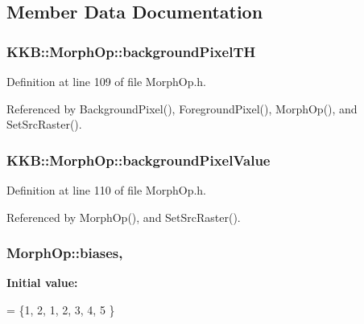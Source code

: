 \subsection{Member Data Documentation}
\subsubsection[{\texorpdfstring{background\+Pixel\+TH}{backgroundPixelTH}}]{ K\+K\+B\+::\+Morph\+Op\+::background\+Pixel\+TH\hspace{0.3cm}{\ttfamily [protected]}}\hypertarget{class_k_k_b_1_1_morph_op_a0f9e76c2f2c45f0563567c49cd69a43b}{}\label{class_k_k_b_1_1_morph_op_a0f9e76c2f2c45f0563567c49cd69a43b}


Definition at line 109 of file Morph\+Op.\+h.



Referenced by Background\+Pixel(), Foreground\+Pixel(), Morph\+Op(), and Set\+Src\+Raster().

\subsubsection[{\texorpdfstring{background\+Pixel\+Value}{backgroundPixelValue}}]{ K\+K\+B\+::\+Morph\+Op\+::background\+Pixel\+Value\hspace{0.3cm}{\ttfamily [protected]}}\hypertarget{class_k_k_b_1_1_morph_op_a0c3862d1c8427c4d246e0bcd56699741}{}\label{class_k_k_b_1_1_morph_op_a0c3862d1c8427c4d246e0bcd56699741}


Definition at line 110 of file Morph\+Op.\+h.



Referenced by Morph\+Op(), and Set\+Src\+Raster().

\subsubsection[{\texorpdfstring{biases}{biases}}]{ Morph\+Op\+::biases\hspace{0.3cm}{\ttfamily [static]}, {\ttfamily [protected]}}\hypertarget{class_k_k_b_1_1_morph_op_a56600e618b25e7c2cda6f513645158e3}{}\label{class_k_k_b_1_1_morph_op_a56600e618b25e7c2cda6f513645158e3}
{\bfseries Initial value\+:}
\begin{DoxyCode}
= \{1,  
                              2,  
                              1,  
                              2,  
                              3,  
                              4,  
                              5   
                             \}
\end{DoxyCode}


